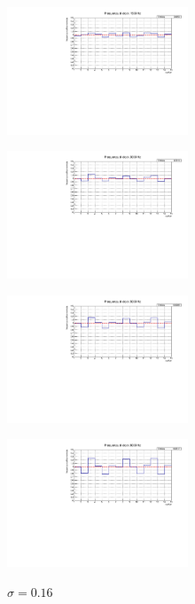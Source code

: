 \documentclass[journal]{IEEEtran}
\begin{document}
\begin{figure}[H]
\begin{center}
\caption{$\sigma = 0.043$}
\includegraphics[width=0.48\textwidth]{analysis/output/dnl_5_1500hz_bars.pdf}
\label{fig:graph_dnl_1500_hz}
\caption{$\sigma = 0.063$}
\includegraphics[width=0.48\textwidth]{analysis/output/dnl_6_3000hz_bars.pdf}
\label{fig:graph_dnl_3000_hz}
\caption{$\sigma = 0.099$}
\includegraphics[width=0.48\textwidth]{analysis/output/dnl_7_5000hz_bars.pdf}
\label{fig:graph_dnl_5000_hz}
\caption{$\sigma = 0.16$}
\includegraphics[width=0.48\textwidth]{analysis/output/dnl_8_8000hz_bars.pdf}
\label{fig:graph_dnl_8000_hz}

\end{center}
\end{figure}
\end{document}
